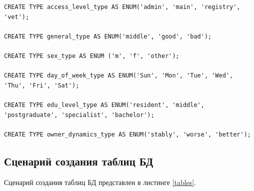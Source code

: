 \documentclass[a4paper,14pt]{article}
\begin{document}
\begin{lstlisting}[label=types,caption=\text{Определение прользовательских типов.}]
CREATE TYPE access_level_type AS ENUM('admin', 'main', 'registry', 'vet');

CREATE TYPE general_type AS ENUM('middle', 'good', 'bad');

CREATE TYPE sex_type AS ENUM ('m', 'f', 'other');

CREATE TYPE day_of_week_type AS ENUM('Sun', 'Mon', 'Tue', 'Wed', 'Thu', 'Fri', 'Sat');

CREATE TYPE edu_level_type AS ENUM('resident', 'middle', 'postgraduate', 'specialist', 'bachelor');

CREATE TYPE owner_dynamics_type AS ENUM('stably', 'worse', 'better');
\end{lstlisting}

\subsection{Сценарий создания таблиц БД}

Сценарий создания таблиц БД представлен в листинге \ref{tables}.
\end{document}
